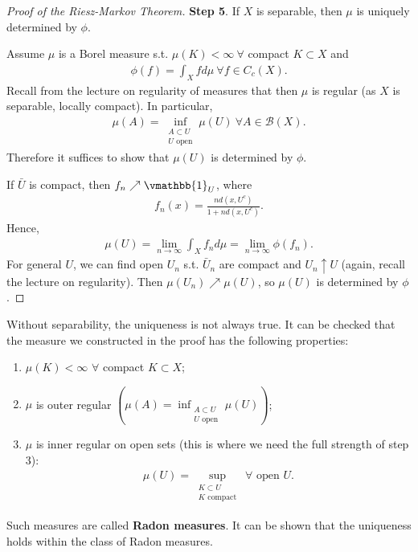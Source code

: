 \begin{proof}[Proof of the Riesz-Markov Theorem]
    \textbf{Step 5}. If \(X\) is separable, then \(\mu\) is uniquely determined by \(\phi\).

    Assume \(\mu\) is a Borel measure s.t. \(\mu(K)<\infty\ \forall\) compact \(K\subset X\) and 
    \begin{align*}
        \phi(f) = \int_X f d\mu \ \forall f\in C_c(X).
    \end{align*}
    Recall from the lecture on regularity of measures that then \(\mu\) is regular (as \(X\) is separable, locally compact). In particular,
    \begin{align*}
        \mu(A) = \inf_{\substack{A\subset U \\ U \text{ open}}} \mu(U) \ \forall A\in \mathscr{B}(X).
    \end{align*}
    Therefore it suffices to show that \(\mu(U)\) is determined by \(\phi\).

    If \(\bar{U}\) is compact, then \(f_n\nearrow \vmathbb{1}_U\), where
    \begin{align*}
        f_n(x) = \frac{n d(x,U^c)}{1 + nd(x,U^c)}.
    \end{align*}
    Hence,
    \begin{align*}
        \mu(U) = \lim\limits_{n\rightarrow\infty}\int_X f_n d\mu = \lim\limits_{n\rightarrow\infty} \phi(f_n).
    \end{align*}
    For general \(U\), we can find open \(U_n\) s.t. \(\bar{U}_n\) are compact and \(U_n\uparrow U\) (again, recall the lecture on regularity). Then \(\mu(U_n)\nearrow\mu(U)\), so \(\mu(U)\) is determined by \(\phi\).
\end{proof}
\begin{remark}
    Without separability, the uniqueness is not always true. It can be checked that the measure we constructed in the proof has the following properties:
    \begin{enumerate}[label=(\roman*)]
        \item \(\mu(K)<\infty\) \(\forall\) compact \(K\subset X\);
        \item \(\mu\) is outer regular \((\mu(A)=\inf_{\substack{A\subset U\\ U\text{ open}}} \mu(U))\);
        \item \(\mu\) is inner regular on open sets (this is where we need the full strength of step 3):
        \begin{align*}
            \mu(U) = \sup_{\substack{K\subset U \\ K \text{ compact}}} \ \forall \text{ open }U.
        \end{align*}
    \end{enumerate}
    Such measures are called \textbf{Radon measures}. It can be shown that the uniqueness holds within the class of Radon measures.
\end{remark}
